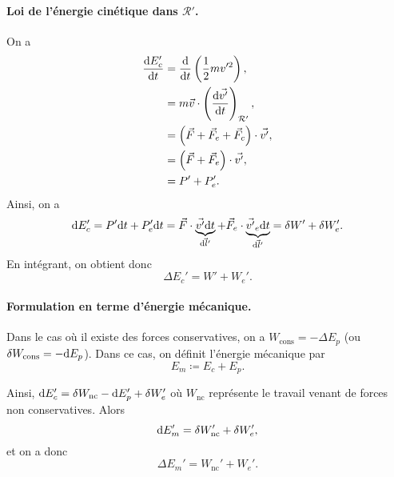             \paragraph{Loi de l'énergie cinétique dans $\mathcal{R}'$.}
                On a 
                \begin{align}
                    \frac{\mathrm{d} E_{c}'}{\mathrm{d} t} 
                    &= \frac{\mathrm{d}}{\mathrm{d} t}\left(\frac{1}{2}m v'^{2}\right),\\
                    &= m\vec{v}\cdot\left(\frac{\mathrm{d}\vec{v'}}{\mathrm{d} t}\right)_{\mathcal{R}'},\\
                    &=\left(\vec{F}+\vec{F}_e+\vec{F}_c\right)\cdot\vec{v'},\\
                    &=\left(\vec{F}+\vec{F}_e\right)\cdot\vec{v'},\\
                    &=P' + P_e'.
                \end{align}
                Ainsi, on a 
                \begin{equation}
                    \mathrm{d} E_c'=P'\mathrm{d} t+P_e'\mathrm{d} t=\vec{F}\cdot\underbrace{\vec{v'}\mathrm{d} t}_{\vec{\mathrm{d} l'}}+\vec{F}_e\cdot\underbrace{\vec{v'}_e\mathrm{d} t}_{\vec{\mathrm{d} l'}}=\delta W'+\delta W_e'.
                \end{equation}
                En intégrant, on obtient donc
                \begin{equation}
                    \boxed{\Delta E_c'=W'+W_e'.}    
                \end{equation}
            
            \paragraph{Formulation en terme d'énergie mécanique.} Dans le cas où il existe des forces conservatives, on a $W_{\text{cons}}=-\Delta E_p$ (ou $\delta W_{\text{cons}}=-\mathrm{d} E_p$). Dans ce cas, on définit l'énergie mécanique par
            \begin{equation}
                \boxed{E_m\coloneqq E_c+E_p.}
            \end{equation}

            Ainsi, $\mathrm{d} E_c'=\delta W_{\text{nc}}-\mathrm{d} E_p'+\delta W_e'$ où $W_{\text{nc}}$ représente le travail venant de forces non conservatives. Alors 
            \begin{equation}
                \mathrm{d} E_m'=\delta W_{\text{nc}}'+\delta W_{e}',
            \end{equation}
            et on a donc
            \begin{equation}
                \boxed{\Delta E_m'=W_{\text{nc}}'+W_e'.}
            \end{equation}
        
